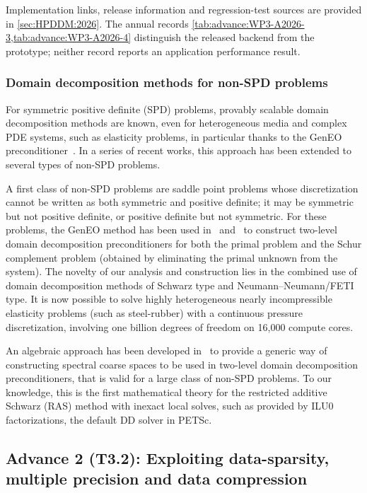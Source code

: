 Implementation links, release information and regression-test sources are provided in \cref{sec:HPDDM:2026}.
The annual records \cref{tab:advance:WP3-A2026-3,tab:advance:WP3-A2026-4} distinguish the released backend from the prototype; neither record reports an application performance result.

 \subsubsection{Domain decomposition methods for non-SPD problems}
  \label{sec:wp3:T31:nonSPD}
For symmetric positive definite (SPD) problems, provably scalable domain decomposition methods are known, even for heterogeneous media and complex PDE systems, such as elasticity problems, in particular thanks to the GenEO preconditioner~\cite{Spillane:2014:ASC, Dolean:2015:IDDSiam}. In a series of recent works, this approach has been extended to several types of non-SPD problems.

A first class of non-SPD problems are saddle point problems whose discretization cannot be written as both symmetric and positive definite; it may be symmetric but not positive definite, or positive definite but not symmetric. For these problems, the GenEO method has been used in~\cite{nataf:hal-02343808} and~\cite{brunelli:hal-05123311} to construct two-level domain decomposition preconditioners for both the primal problem and the Schur complement problem (obtained by eliminating the primal unknown from the system). The novelty of our analysis and construction lies in the combined use of domain decomposition methods of Schwarz type and Neumann–Neumann/FETI type. It is now possible to solve highly heterogeneous nearly incompressible elasticity problems (such as steel-rubber) with a continuous pressure discretization, involving one billion degrees of freedom on 16,000 compute cores.

An algebraic approach has been developed in~\cite{nataf:hal-04536547} to provide a generic way of constructing spectral coarse spaces to be used in two-level domain decomposition preconditioners, that is valid for a large class of non-SPD problems. To our knowledge, this is the first mathematical theory for the restricted additive Schwarz (RAS) method with inexact local solves, such as provided by ILU0 factorizations, the default DD solver in PETSc. 


 \subsection{  Advance 2 (T3.2): Exploiting data-sparsity, multiple precision and data compression}
\label{sec:wp3:T32}

